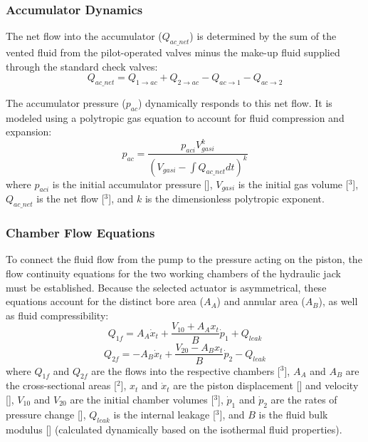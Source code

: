 \documentclass[
bindingoffset=5mm,  %
footnoteindent=3mm, %
hyphenation=true    %
]{src/wut-thesis}
\begin{document}
	\subsubsection{Accumulator Dynamics}
	The net flow into the accumulator ($Q_{ac\_net}$) is determined by the sum of the vented fluid from the pilot-operated valves minus the make-up fluid supplied through the standard check valves:
	\begin{equation}
		Q_{ac\_net} = Q_{1 \to ac} + Q_{2 \to ac} - Q_{ac \to 1} - Q_{ac \to 2}
	\end{equation}
	
	The accumulator pressure ($p_{ac}$) dynamically responds to this net flow. It is modeled using a polytropic gas equation to account for fluid compression and expansion:
	\begin{equation}
		p_{ac} = \frac{p_{aci} V_{gasi}^k}{(V_{gasi} - \int Q_{ac\_net} dt)^k}
	\end{equation}
	where $p_{aci}$ is the initial accumulator pressure [], $V_{gasi}$ is the initial gas volume [$^3$], $Q_{ac\_net}$ is the net flow [$^3$], and $k$ is the dimensionless polytropic exponent.
	
	\subsubsection{Chamber Flow Equations}
	To connect the fluid flow from the pump to the pressure acting on the piston, the flow continuity equations for the two working chambers of the hydraulic jack must be established. Because the selected actuator is asymmetrical, these equations account for the distinct bore area ($A_A$) and annular area ($A_B$), as well as fluid compressibility:
	\begin{equation}
		Q_{1f} = A_{A}\dot{x}_{t} + \frac{V_{10} + A_{A}x_{t}}{B}\dot{p}_{1} + Q_{leak}
	\end{equation}
	\begin{equation}
		Q_{2f} = -A_{B}\dot{x}_{t} + \frac{V_{20} - A_{B}x_{t}}{B}\dot{p}_{2} - Q_{leak}
	\end{equation}
	where $Q_{1f}$ and $Q_{2f}$ are the flows into the respective chambers [$^3$], $A_{A}$ and $A_{B}$ are the cross-sectional areas [$^2$], $x_{t}$ and $\dot{x}_{t}$ are the piston displacement [] and velocity [], $V_{10}$ and $V_{20}$ are the initial chamber volumes [$^3$], $\dot{p}_{1}$ and $\dot{p}_{2}$ are the rates of pressure change [], $Q_{leak}$ is the internal leakage [$^3$], and $B$ is the fluid bulk modulus [] (calculated dynamically based on the isothermal fluid properties). 
	
\end{document}
